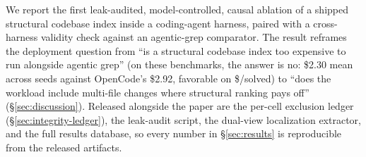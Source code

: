 We report the first leak-audited, model-controlled, causal ablation of a shipped
structural codebase index inside a coding-agent harness, paired with a cross-harness
validity check against an agentic-grep comparator. The result reframes the deployment
question from ``is a structural codebase index too expensive to run alongside agentic
grep'' (on these benchmarks, the answer is no: \$2.30 mean across seeds against
OpenCode's \$2.92, favorable on \$/solved) to ``does the workload include multi-file
changes where structural ranking pays off'' (\S\ref{sec:discussion}). Released alongside
the paper are the per-cell exclusion ledger (\S\ref{sec:integrity-ledger}), the leak-audit
script, the dual-view localization extractor, and the full results database, so every
number in \S\ref{sec:results} is reproducible from the released artifacts.
